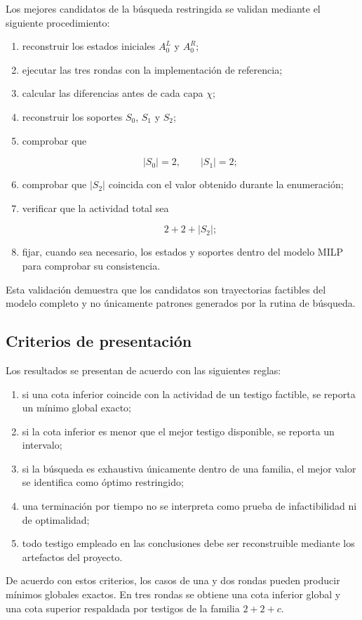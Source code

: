 Los mejores candidatos de la búsqueda restringida se validan mediante el
siguiente procedimiento:

\begin{enumerate}
    \item reconstruir los estados iniciales $A_0^L$ y $A_0^R$;

    \item ejecutar las tres rondas con la implementación de referencia;

    \item calcular las diferencias antes de cada capa $\chi$;

    \item reconstruir los soportes $S_0$, $S_1$ y $S_2$;

    \item comprobar que

    \[
    |S_0|=2,
    \qquad
    |S_1|=2;
    \]

    \item comprobar que $|S_2|$ coincida con el valor obtenido durante la
    enumeración;

    \item verificar que la actividad total sea

    \[
    2+2+|S_2|;
    \]

    \item fijar, cuando sea necesario, los estados y soportes dentro del
    modelo MILP para comprobar su consistencia.
\end{enumerate}

Esta validación demuestra que los candidatos son trayectorias factibles del
modelo completo y no únicamente patrones generados por la rutina de
búsqueda.


\subsection{Criterios de presentación}
\label{subsec:criterios_presentacion}

Los resultados se presentan de acuerdo con las siguientes reglas:

\begin{enumerate}
    \item si una cota inferior coincide con la actividad de un testigo
    factible, se reporta un mínimo global exacto;

    \item si la cota inferior es menor que el mejor testigo disponible, se
    reporta un intervalo;

    \item si la búsqueda es exhaustiva únicamente dentro de una familia,
    el mejor valor se identifica como óptimo restringido;

    \item una terminación por tiempo no se interpreta como prueba de
    infactibilidad ni de optimalidad;

    \item todo testigo empleado en las conclusiones debe ser reconstruible
    mediante los artefactos del proyecto.
\end{enumerate}

De acuerdo con estos criterios, los casos de una y dos rondas pueden
producir mínimos globales exactos. En tres rondas se obtiene una cota
inferior global y una cota superior respaldada por testigos de la familia
$2+2+c$.